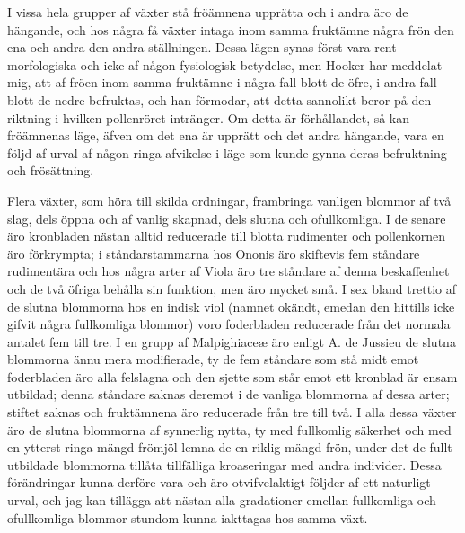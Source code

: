 I vissa hela grupper af växter stå fröämnena upprätta och i andra äro de hängande, och hos några få växter intaga inom samma fruktämne några frön den ena och andra den andra ställningen. Dessa lägen synas först vara rent morfologiska och icke af någon fysiologisk betydelse, men Hooker har meddelat mig, att af fröen inom samma fruktämne i några fall blott de öfre, i andra fall blott de nedre befruktas, och han förmodar, att detta sannolikt beror på den riktning i hvilken pollenröret intränger. Om detta är förhållandet, så kan fröämnenas läge, äfven om det ena är upprätt och det andra hängande, vara en följd af urval af någon ringa afvikelse i läge som kunde gynna deras befruktning och frösättning.

Flera växter, som höra till skilda ordningar, frambringa vanligen blommor af två slag, dels öppna och af vanlig skapnad, dels slutna och ofullkomliga. I de senare äro kronbladen nästan alltid reducerade till blotta rudimenter och pollenkornen äro förkrympta; i ståndarstammarna hos Ononis äro skiftevis fem ståndare rudimentära och hos några arter af Viola äro tre ståndare af denna beskaffenhet och de två öfriga behålla sin funktion, men äro mycket små. I sex bland trettio af de slutna blommorna hos en indisk viol (namnet okändt, emedan den hittills icke gifvit några fullkomliga blommor) voro foderbladen reducerade från det normala antalet fem till tre. I en grupp af Malpighiaceæ äro enligt A. de Jussieu de slutna blommorna ännu mera modifierade, ty de fem ståndare som stå midt emot foderbladen äro alla felslagna och den sjette som står emot ett kronblad är ensam utbildad; denna ståndare saknas deremot i de vanliga blommorna af dessa arter; stiftet saknas och fruktämnena äro reducerade från tre till två. I alla dessa växter äro de slutna blommorna af synnerlig nytta, ty med fullkomlig säkerhet och med en ytterst ringa mängd frömjöl lemna de en riklig mängd frön, under det de fullt utbildade blommorna tillåta tillfälliga kroaseringar med andra individer. Dessa förändringar kunna derföre vara och äro otvifvelaktigt följder af ett naturligt urval, och jag kan tillägga att nästan alla gradationer emellan fullkomliga och ofullkomliga blommor stundom kunna iakttagas hos samma växt.

